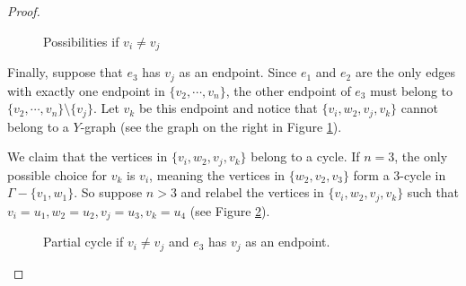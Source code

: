 \begin{proof}
\begin{figure}[h!]
        \quad\quad
        \caption{Possibilities if \(v_i \neq v_j\)}
        \label{fig:lem:is_surface_2_3}
    \end{figure}

    Finally, suppose that \(e_3\) has \(v_j\) as an endpoint. 
    Since \(e_1\) and \(e_2\) are the only edges with exactly one endpoint in \(\{v_2, \cdots, v_n\}\),
    the other endpoint of \(e_3\) must belong to \(\{v_2, \cdots, v_n\}\setminus\{v_j\}\).
    Let \(v_k\) be this endpoint and notice that \(\{v_i, w_2, v_j, v_k\}\) cannot belong to a \(Y\)-graph
    (see the graph on the right in Figure \ref{fig:lem:is_surface_2_3}).
    
    We claim that the vertices in \(\{v_i, w_2, v_j, v_k\}\) belong to a cycle.
    If \(n = 3\), the only possible choice for \(v_k\) is \(v_i\), 
    meaning the vertices in \(\{w_2, v_2, v_3\}\) form a \(3\)-cycle in \(\Gamma - \{v_1, w_1\}\).
    So suppose \(n > 3\) and relabel the vertices in \(\{v_i, w_2, v_j, v_k\}\) such that 
    \(v_i = u_1, w_2 = u_2, v_j = u_3, v_k = u_4\) (see Figure \ref{fig:lem:is_surface_2_4}).
    \begin{figure}[h!]
        \centering
        \caption{Partial cycle if \(v_i \neq v_j\) and \(e_3\) has \(v_j\) as an endpoint.}
        \label{fig:lem:is_surface_2_4}
    \end{figure}


\end{proof}

